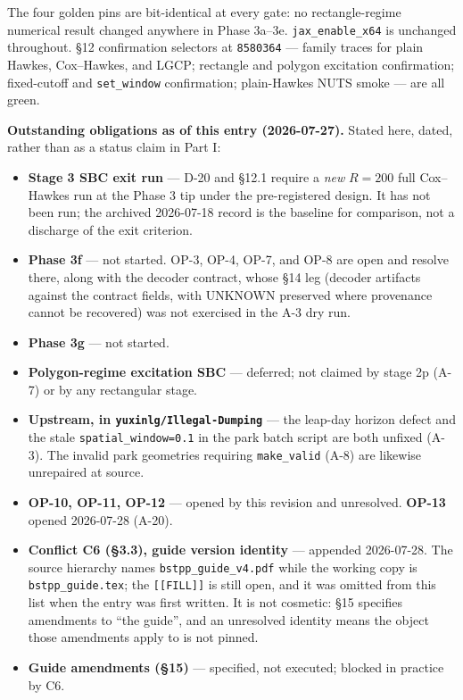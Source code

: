 \documentclass[
  10pt,
]{article}
\providecommand{\tightlist}{%
  \setlength{\itemsep}{0pt}\setlength{\parskip}{0pt}}
\begin{document}
The four golden pins are bit-identical at every gate: no rectangle-regime numerical result changed anywhere in Phase 3a--3e. \texttt{jax\_enable\_x64} is unchanged throughout. §12 confirmation selectors at \texttt{8580364} --- family traces for plain Hawkes, Cox--Hawkes, and LGCP; rectangle and polygon excitation confirmation; fixed-cutoff and \texttt{set\_window} confirmation; plain-Hawkes NUTS smoke --- are all green.

\textbf{Outstanding obligations as of this entry (2026-07-27).} Stated here, dated, rather than as a status claim in Part I:

\begin{itemize}
\tightlist
\item
  \textbf{Stage 3 SBC exit run} --- D-20 and §12.1 require a \emph{new} \(R = 200\) full Cox--Hawkes run at the Phase 3 tip under the pre-registered design. It has not been run; the archived 2026-07-18 record is the baseline for comparison, not a discharge of the exit criterion.
\item
  \textbf{Phase 3f} --- not started. OP-3, OP-4, OP-7, and OP-8 are open and resolve there, along with the decoder contract, whose §14 leg (decoder artifacts against the contract fields, with UNKNOWN preserved where provenance cannot be recovered) was not exercised in the A-3 dry run.
\item
  \textbf{Phase 3g} --- not started.
\item
  \textbf{Polygon-regime excitation SBC} --- deferred; not claimed by stage 2p (A-7) or by any rectangular stage.
\item
  \textbf{Upstream, in \texttt{yuxinlg/Illegal-Dumping}} --- the leap-day horizon defect and the stale \texttt{spatial\_window=0.1} in the park batch script are both unfixed (A-3). The invalid park geometries requiring \texttt{make\_valid} (A-8) are likewise unrepaired at source.
\item
  \textbf{OP-10, OP-11, OP-12} --- opened by this revision and unresolved. \textbf{OP-13} opened 2026-07-28 (A-20).
\item
  \textbf{Conflict C6 (§3.3), guide version identity} --- appended 2026-07-28. The source hierarchy names \texttt{bstpp\_guide\_v4.pdf} while the working copy is \texttt{bstpp\_guide.tex}; the \texttt{[[FILL]]} is still open, and it was omitted from this list when the entry was first written. It is not cosmetic: §15 specifies amendments to ``the guide'', and an unresolved identity means the object those amendments apply to is not pinned.
\item
  \textbf{Guide amendments (§15)} --- specified, not executed; blocked in practice by C6.
\end{itemize}
\end{document}
